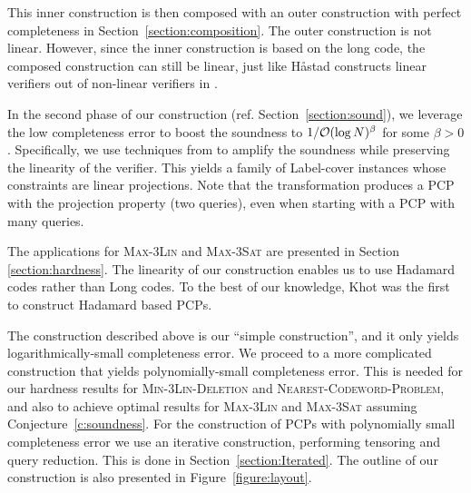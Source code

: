 This inner construction is then composed with an outer construction
with perfect completeness in Section~\ref{section:composition}. The
outer construction is not linear. However, since the inner
construction is based on the long code, the composed construction can
still be linear, just like H\aa stad constructs linear verifiers out
of non-linear verifiers in \cite{Has97}.

In the second phase of our construction
(ref. Section~\ref{section:sound}), we leverage the low completeness
error to boost the soundness to $1/{\cal O}(\log N)^\beta$ for some
$\beta >0$. Specifically, we use techniques from \cite{MR08} to
amplify the soundness while preserving the linearity of the
verifier. This yields a family of {\sf Label-cover} instances whose
constraints are linear projections. Note that the \cite{MR08}
transformation produces a PCP with the projection property (two
queries), even when starting with a PCP with many queries.

The applications for \textsc{Max-3Lin} and \textsc{Max-3Sat} are
presented in Section \ref{section:hardness}. The linearity of our
construction enables us to use Hadamard codes rather than Long
codes. To the best of our knowledge, Khot \cite{Khot01} was the first
to construct Hadamard based PCPs.

The construction described above is our ``simple construction'', and
it only yields logarithmically-small completeness error. We proceed to
a more complicated construction that yields polynomially-small
completeness error. This is needed for our hardness results for
\textsc{Min-3Lin-Deletion} and \textsc{Nearest-Codeword-Problem}, and
also to achieve optimal results for \textsc{Max-3Lin} and
\textsc{Max-3Sat} assuming Conjecture~\ref{c:soundness}.  For the
construction of PCPs with polynomially small completeness error we use
an iterative construction, performing tensoring and query
reduction. This is done in Section~\ref{section:Iterated}. The outline
of our construction is also presented in Figure~\ref{figure:layout}.

